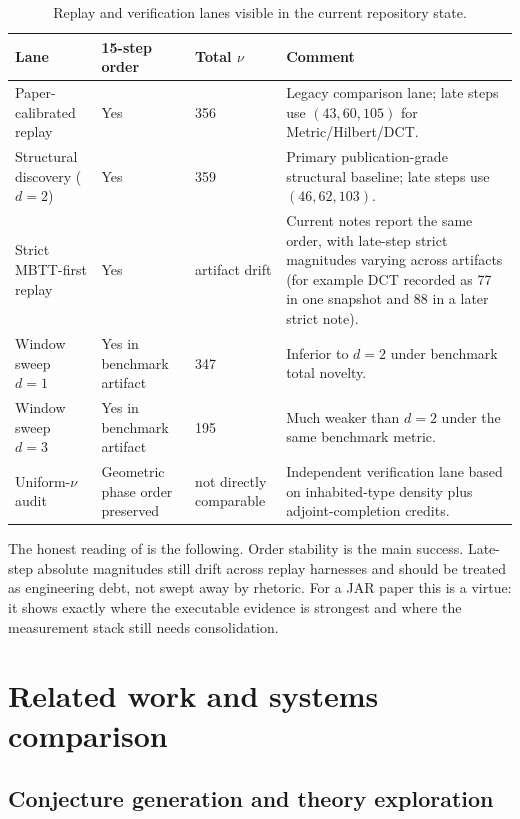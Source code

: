 \documentclass[pdflatex,sn-mathphys,Numbered]{sn-jnl}
\theoremstyle{thmstyleone}
\theoremstyle{thmstylethree}
\theoremstyle{thmstyletwo}
\begin{document}
\begin{table}[t]
\centering
\caption{Replay and verification lanes visible in the current repository state.}
\label{tab:lanes}
\footnotesize
\begin{tabular}{@{}p{3.35cm}p{1.4cm}p{1.45cm}p{5.0cm}@{}}
\toprule
Lane & 15-step order & Total $\nu$ & Comment \\
\midrule
Paper-calibrated replay & Yes & 356 & Legacy comparison lane; late steps use $(43,60,105)$ for Metric/Hilbert/DCT. \\
Structural discovery ($d=2$) & Yes & 359 & Primary publication-grade structural baseline; late steps use $(46,62,103)$. \\
Strict MBTT-first replay & Yes & artifact drift & Current notes report the same order, with late-step strict magnitudes varying across artifacts (for example DCT recorded as 77 in one snapshot and 88 in a later strict note). \\
Window sweep $d=1$ & Yes in benchmark artifact & 347 & Inferior to $d=2$ under benchmark total novelty. \\
Window sweep $d=3$ & Yes in benchmark artifact & 195 & Much weaker than $d=2$ under the same benchmark metric. \\
Uniform-$\nu$ audit & Geometric phase order preserved & not directly comparable & Independent verification lane based on inhabited-type density plus adjoint-completion credits. \\
\bottomrule
\end{tabular}
\end{table}

The honest reading of  is the following. Order stability is the main success. Late-step absolute magnitudes still drift across replay harnesses and should be treated as engineering debt, not swept away by rhetoric. For a JAR paper this is a virtue: it shows exactly where the executable evidence is strongest and where the measurement stack still needs consolidation.

\section{Related work and systems comparison}\label{sec:related}

\subsection{Conjecture generation and theory exploration}
\end{document}
